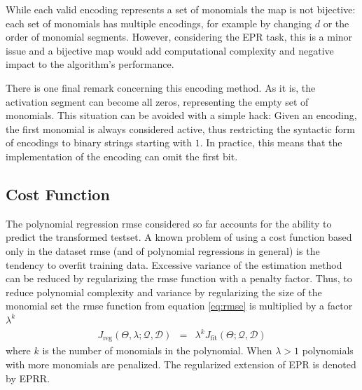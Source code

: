 \documentclass[review,preprint]{elsarticle}
\newcommand{\revised}[2]{}
\begin{document}
While each valid encoding represents a set of monomials the map is not bijective: each set of monomials has multiple encodings, for example by changing $d$ or the order of monomial segments. However, considering the \ac{EPR} task, this is a minor issue and a bijective map would add computational complexity and negative impact to the algorithm's performance\revised{The encoding example should include the inactive term so that both examples are consistent (lines 113-115). Is there a reference some experimentation to back this up?}{We changed the text according to the suggestion.}.

There is one final remark concerning this encoding method. As it is, the activation segment can become all zeros, representing the empty set of monomials. This situation can be avoided with a simple hack: Given an encoding, the first monomial is always considered active, thus restricting the syntactic form of encodings to binary strings starting with $1$. In practice, this means that the implementation of the encoding can omit the first bit.

\subsection{Cost Function}\label{subs:cost.function}

The polynomial regression \ac{rmse} considered so far accounts for the ability to predict the transformed testset. A known problem of using a cost function based only in the dataset \ac{rmse} (and of polynomial regressions in general) is the tendency to overfit  training data. Excessive variance of the estimation method can be reduced by regularizing the \ac{rmse} function with a penalty factor. Thus, to reduce polynomial complexity and variance by regularizing the size of the monomial set the \ac{rmse} function from equation \ref{eq:rmse} is multiplied by a factor $\lambda^{k}$
\begin{eqnarray}
J_{\textrm{reg}}\left(\Theta, \lambda;\mathcal{Q},\mathcal{D}\right) &=& \lambda^{k} J_{\textrm{fit}}\left(\Theta;\mathcal{Q},\mathcal{D}\right)\label{eq:rmse-reg}
\end{eqnarray}
%
where $k$ is the number of monomials in the polynomial. When $\lambda > 1$ polynomials with more monomials are penalized. The regularized extension of \ac{EPR} is denoted by \acf{EPRR}. 
\end{document}
